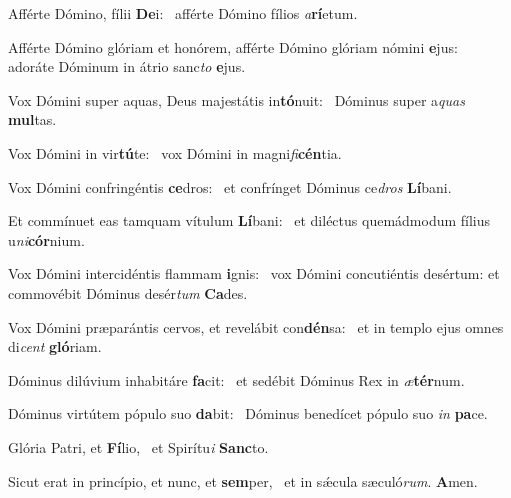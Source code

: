 \item Afférte Dómino, fílii \textbf{De}i:~\psstar{} afférte Dómino fílios \textit{a}\textbf{rí}etum.
\item Afférte Dómino glóriam et honórem, afférte Dómino glóriam nómini \textbf{e}jus:~\psstar{} adoráte Dóminum in átrio sanc\textit{to} \textbf{e}jus.
\item Vox Dómini super aquas, Deus majestátis in\textbf{tó}nuit:~\psstar{} Dóminus super a\textit{quas} \textbf{mul}tas.
\item Vox Dómini in vir\textbf{tú}te:~\psstar{} vox Dómini in magni\textit{fi}\textbf{cén}tia.
\item Vox Dómini confringéntis \textbf{ce}dros:~\psstar{} et confrínget Dóminus ce\textit{dros} \textbf{Lí}bani.
\item Et commínuet eas tamquam vítulum \textbf{Lí}bani:~\psstar{} et diléctus quemádmodum fílius u\textit{ni}\textbf{cór}nium.
\item Vox Dómini intercidéntis flammam \textbf{i}gnis:~\psstar{} vox Dómini concutiéntis desértum: et commovébit Dóminus desér\textit{tum} \textbf{Ca}des.
\item Vox Dómini præparántis cervos, et revelábit con\textbf{dén}sa:~\psstar{} et in templo ejus omnes di\textit{cent} \textbf{gló}riam.
\item Dóminus dilúvium inhabitáre \textbf{fa}cit:~\psstar{} et sedébit Dóminus Rex in \textit{æ}\textbf{tér}num.
\item Dóminus virtútem pópulo suo \textbf{da}bit:~\psstar{} Dóminus benedícet pópulo suo \textit{in} \textbf{pa}ce.
\item Glória Patri, et \textbf{Fí}lio,~\psstar{} et Spirítu\textit{i} \textbf{Sanc}to.
\item Sicut erat in princípio, et nunc, et \textbf{sem}per,~\psstar{} et in sǽcula sæculó\textit{rum}. \textbf{A}men.
